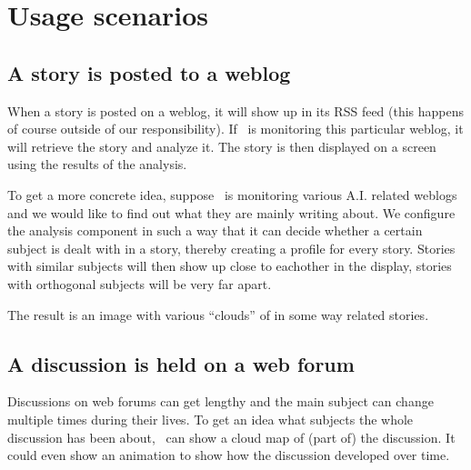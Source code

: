 \chapter{Usage scenarios}

\section{A story is posted to a weblog}

When a story is posted on a weblog, it will show up in its RSS feed (this
happens of course outside of our responsibility). If \Amber\ is monitoring this
particular weblog, it will retrieve the story and analyze it. The story is then
displayed on a screen using the results of the analysis.

To get a more concrete idea, suppose \Amber\ is monitoring various A.I. related
weblogs and we would like to find out what they are mainly writing about. We
configure the analysis component in such a way that it can decide whether a
certain subject is dealt with in a story, thereby creating a profile for every
story. Stories with similar subjects will then show up close to eachother in
the display, stories with orthogonal subjects will be very far apart.

The result is an image with various ``clouds'' of in some way related stories.

\section{A discussion is held on a web forum}

Discussions on web forums can get lengthy and the main subject can change
multiple times during their lives. To get an idea what subjects the whole
discussion has been about, \Amber\ can show a cloud map of (part of) the
discussion. It could even show an animation to show how the discussion
developed over time.
